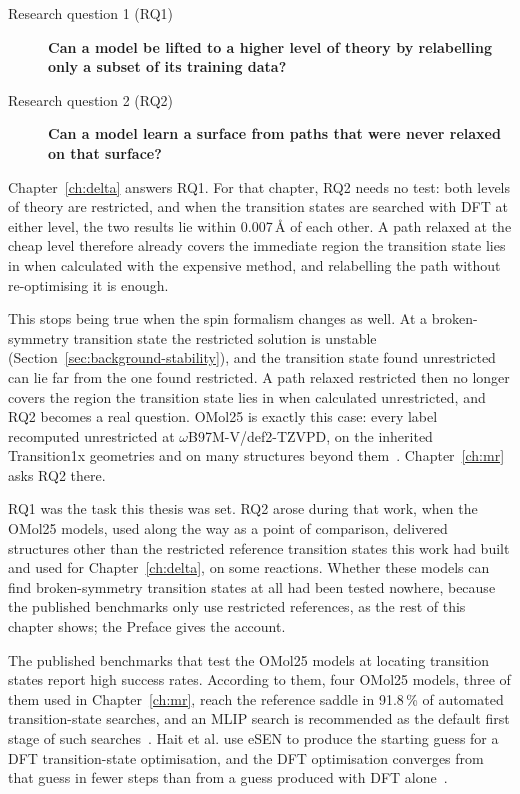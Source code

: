 \noindent
\begin{minipage}{\linewidth}
\begin{description}
  \item[Research question 1 (RQ1)] \textbf{Can a model be lifted to a higher
    level of theory by relabelling only a subset of its training data?}
  \item[Research question 2 (RQ2)] \textbf{Can a model learn a surface from
    paths that were never relaxed on that surface?}
\end{description}
\end{minipage}

Chapter~\ref{ch:delta} answers RQ1. For that chapter, RQ2 needs no
test: both levels of theory are restricted, and when the transition
states are searched with DFT at either level, the two results lie
within 0.007\,\AA{} of each other. A path relaxed at the cheap level
therefore already covers the immediate region the transition state
lies in when calculated with the expensive method, and relabelling the
path without re-optimising it is enough.

This stops being true when the spin formalism changes as well. At a
broken-symmetry transition state the restricted solution is unstable
(Section~\ref{sec:background-stability}), and the transition state
found unrestricted can lie far from the one found restricted. A path
relaxed restricted then no longer covers the region the transition
state lies in when calculated unrestricted, and RQ2 becomes a real
question. OMol25 is exactly this case: every label recomputed
unrestricted at \mbox{$\omega$B97M-V/def2-TZVPD}, on the inherited
Transition1x geometries and on many structures beyond
them~\cite{omol25}. Chapter~\ref{ch:mr} asks RQ2 there.

RQ1 was the task this thesis was set. RQ2 arose during that work,
when the OMol25 models, used along the way as a point of comparison,
delivered structures other than the restricted reference transition
states this work had built and used for Chapter~\ref{ch:delta}, on
some reactions. Whether these models can find broken-symmetry
transition states at all had been tested nowhere, because the
published benchmarks only use restricted references, as the rest of
this chapter shows; the Preface gives the account.

The published benchmarks that test the OMol25 models at locating
transition states report high success rates. According to them, four
OMol25 models, three
of them used in Chapter~\ref{ch:mr}, reach the reference saddle in 91.8\,\% of
automated transition-state searches, and an MLIP search is recommended
as the default first stage of such searches~\cite{marks2026}. Hait et
al. use eSEN to produce the starting guess for a DFT transition-state
optimisation, and the DFT optimisation converges from that guess in
fewer steps than from a guess produced with DFT alone~\cite{hait2025}.

